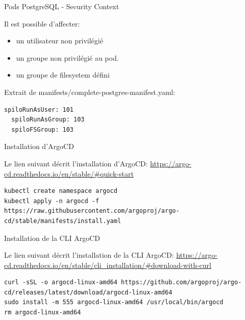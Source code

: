 \begin{frame}[fragile]{Pods PostgreSQL - Security Context}

   Il est possible d'affecter:
\begin{itemize}
   \item un utilisateur non privilégié
   \item un groupe non privilégié au pod.
   \item un groupe de filesystem défini
\end{itemize}

   Extrait de manifests/complete-postgres-manifest.yaml:
\begin{tiny}
\begin{Verbatim}[commandchars=\&\@\@]
  spiloRunAsUser: 101
  spiloRunAsGroup: 103
  spiloFSGroup: 103
\end{Verbatim}
\end{tiny}

\end{frame}


\begin{frame}[fragile]{Installation d'ArgoCD}

Le lien suivant décrit l'installation d'ArgoCD: \url{https://argo-cd.readthedocs.io/en/stable/#quick-start}

\begin{tiny}
\begin{Verbatim}[commandchars=\&\#\#]
kubectl create namespace argocd
kubectl apply -n argocd -f https://raw.githubusercontent.com/argoproj/argo-cd/stable/manifests/install.yaml
\end{Verbatim}
\end{tiny}

\end{frame}


\begin{frame}[fragile]{Installation de la CLI ArgoCD}

Le lien suivant décrit l'installation de la CLI ArgoCD: \url{https://argo-cd.readthedocs.io/en/stable/cli_installation/#download-with-curl}

\begin{tiny}
\begin{Verbatim}[commandchars=\&\#\#]
curl -sSL -o argocd-linux-amd64 https://github.com/argoproj/argo-cd/releases/latest/download/argocd-linux-amd64
sudo install -m 555 argocd-linux-amd64 /usr/local/bin/argocd
rm argocd-linux-amd64
\end{Verbatim}
\end{tiny}


\end{frame}

